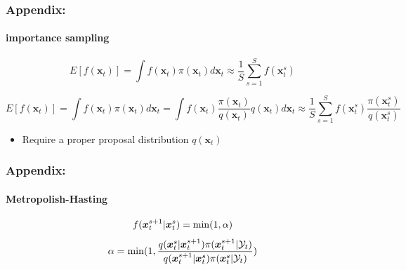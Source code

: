 \begin{frame}
\frametitle{Appendix:}
\framesubtitle{importance sampling}
\begin{equation*}
E[f(\boldsymbol{x}_{t})] = \int f(\boldsymbol{x}_{t})\pi(\boldsymbol{x}_{t}) d\boldsymbol{x}_{t}
\approx \frac{1}{S}\sum_{s=1}^{S} f(\boldsymbol{x}_{t}^{s})
\end{equation*}


\begin{equation*}
    E[f(\boldsymbol{x}_{t})] = \int f(\boldsymbol{x}_{t})\pi(\boldsymbol{x}_{t}) d\boldsymbol{x}_{t} = \int f(\boldsymbol{x}_{t})\frac{\pi(\boldsymbol{x}_{t})}{q(\boldsymbol{x}_{t})}q(\boldsymbol{x}_{t}) d\boldsymbol{x}_{t}
    \approx \frac{1}{S} \sum_{s=1}^{S} f(\boldsymbol{x}_{t}^{s})\frac{\pi(\boldsymbol{x}_{t}^{s})}{q(\boldsymbol{x}_{t}^{s})}
\end{equation*}

    \begin{itemize}
        \item Require a proper proposal distribution $q(\boldsymbol{x}_{t})$

    \end{itemize}

\end{frame}
\begin{frame}
\frametitle{Appendix:}
\framesubtitle{Metropolish-Hasting}
\begin{equation*}
f(\boldsymbol{x}_{t}^{s+1}|\boldsymbol{x}_{t}^{s})=\rm{min}(1,\alpha)
\end{equation*}
\begin{equation*}
\alpha = {\rm{min}} (1,
\frac{q(\boldsymbol{x}_{t}^{s}|\boldsymbol{x}_{t}^{s+1})  \pi(\boldsymbol{x}_{t}^{s+1}|\mathcal{Y}_{t})}
{q(\boldsymbol{x}_{t}^{s+1}|\boldsymbol{x}_{t}^{s})   \pi(\boldsymbol{x}_{t}^{s}|\mathcal{Y}_{t})} )
\end{equation*}

\end{frame}
